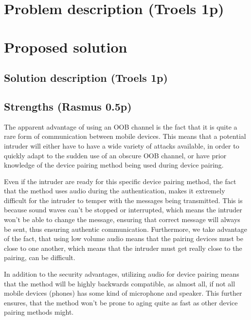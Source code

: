 \documentclass[12pt]{article}
\begin{document}
\newpage

\section{Problem description (Troels 1p)}
\label{sec:Problem}

\newpage

\section{Proposed solution}
\label{sec:Proposed solution}

\subsection{Solution description (Troels 1p)}
\label{sub:Solution description}

\subsection{Strengths (Rasmus 0.5p)}
\label{sub:Strengths}

The apparent advantage of using an OOB channel is the fact that it is quite a rare form of communication between mobile devices. This means that a potential intruder will either have to have a wide variety of attacks available, in order to quickly adapt to the sudden use of an obscure OOB channel, or have prior knowledge of the device pairing method being used during device pairing.

Even if the intruder are ready for this specific device pairing method, the fact that the method uses audio during the authentication, makes it extremely difficult for the intruder to temper with the messages being transmitted. This is because sound waves can't be stopped or interrupted, which means the intruder won't be able to change the message, ensuring that correct message will always be sent, thus ensuring authentic communication. Furthermore, we take advantage of the fact, that using low volume audio means that the pairing devices must be close to one another, which means that the intruder must get really close to the pairing, can be difficult.

In addition to the security advantages, utilizing audio for device pairing means that the method will be highly backwards compatible, as almost all, if not all mobile devices (phones) has some kind of microphone and speaker. This further ensures, that the method won't be prone to aging quite as fast as other device pairing methods might.
\end{document}

